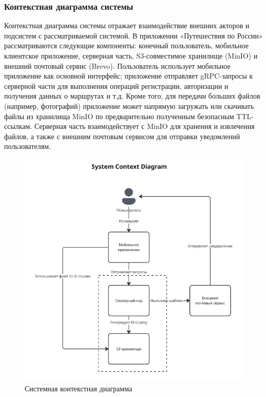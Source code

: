 \subsubsection*{Контекстная диаграмма системы}
Контекстная диаграмма системы отражает взаимодействие внешних акторов и подсистем с рассматриваемой системой. В приложении «Путешествия по России» рассматриваются следующие компоненты: конечный пользователь, мобильное клиентское приложение, серверная часть, S3-совместимое хранилище (MinIO) и внешний почтовый сервис (Brevo). Пользователь использует мобильное приложение как основной интерфейс; приложение отправляет gRPC-запросы к серверной части для выполнения операций регистрации, авторизации и получения данных о маршрутах и т.д.
Кроме того, для передачи больших файлов (например, фотографий) приложение может напрямую загружать или скачивать файлы из хранилища MinIO по предварительно полученным безопасным TTL-ссылкам. Серверная часть взаимодействует с MinIO для хранения и извлечения файлов, а также с внешним почтовым сервисом для отправки уведомлений пользователям.
\begin{figure}[H]
        \centering
        \includegraphics[width=0.8\linewidth]{Images/second_chapter_backend_architecture/Picture1.png}
        \caption{Системная контекстная диаграмма}
        \label{fig:system-context-diagram}
\end{figure}

